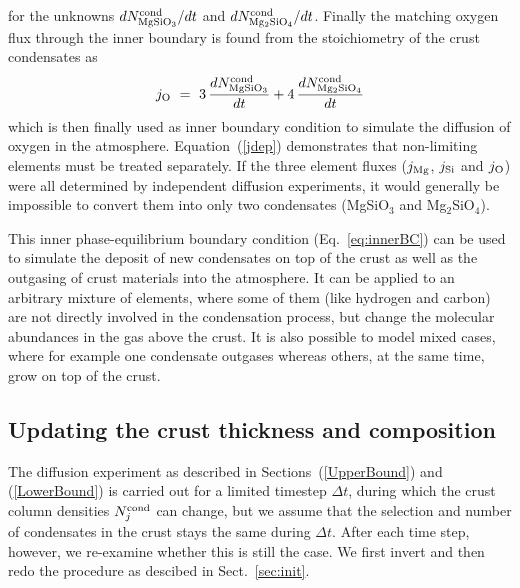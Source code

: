 \documentclass[11pt]{article}
\begin{document}
for the unknowns $dN_{\rm MgSiO_3}^{\rm cond}/dt$ and $dN_{\rm Mg_2SiO_4}^{\rm
  cond}/dt$. Finally the matching oxygen flux through the inner 
boundary is found from the stoichiometry of the crust condensates as
\begin{equation}
  j_{\rm O} ~=~ 3\, \frac{dN_{\rm MgSiO_3}^{\rm cond}}{dt}
             + 4\, \frac{dN_{\rm Mg_2SiO_4}^{\rm cond}}{dt}
  \label{jdep}
\end{equation}
which is then finally used as inner boundary condition to simulate
the diffusion of oxygen in the atmosphere. Equation~(\ref{jdep})
demonstrates that non-limiting elements must be treated separately. 
If the three element fluxes ($j_{\rm Mg}$, $j_{\rm Si}$ and $j_{\rm
  O}$) were all determined by independent diffusion experiments, it would
generally be impossible to convert them into only two condensates
(MgSiO$_3$ and Mg$_2$SiO$_4$). 

This inner phase-equilibrium boundary condition (Eq.~\ref{eq:innerBC})
can be used to simulate the deposit of new condensates on top of the
crust as well as the outgasing of crust materials into the
atmosphere. It can be applied to an arbitrary mixture of elements,
where some of them (like hydrogen and carbon) are not directly
involved in the condensation process, but change the molecular
abundances in the gas above the crust. It is also possible to model
mixed cases, where for example one condensate outgases whereas others,
at the same time, grow on top of the crust.


\subsection{Updating the crust thickness and composition}

The diffusion experiment as described in Sections~(\ref{UpperBound})
and (\ref{LowerBound}) is carried out for a limited timestep $\Delta
t$, during which the crust column densities $N_j^{\rm cond}$ can
change, but we assume that the selection and number of 
condensates in the crust stays the same during $\Delta t$.  After
each time step, however, we re-examine whether this is still the case.
We first invert and then redo the procedure as descibed in
Sect.~\ref{sec:init}.
 
\end{document}
